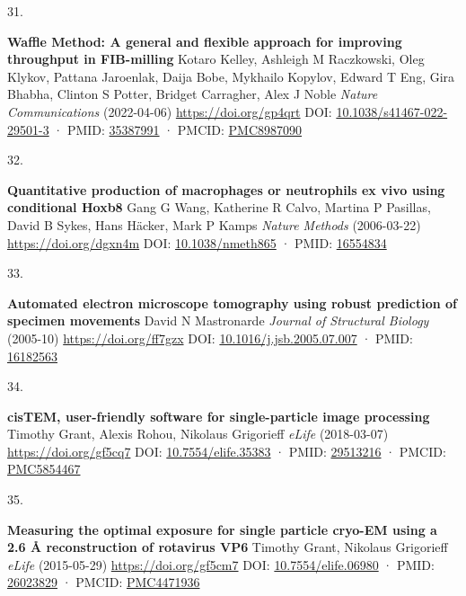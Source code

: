 \documentclass[
]{article}
\newlength{\cslhangindent}
\newlength{\csllabelwidth}
\newlength{\cslentryspacingunit} %
\newenvironment{CSLReferences}[2] %
 {%
  \setlength{\parindent}{0pt}
  \ifodd #1
  \let\oldpar\par
  \def\par{\hangindent=\cslhangindent\oldpar}
  \fi
  \setlength{\parskip}{#2\cslentryspacingunit}
 }%
 {}
\newcommand{\CSLBlock}[1]{#1\hfill\break}
\newcommand{\CSLLeftMargin}[1]{\parbox[t]{\csllabelwidth}{#1}}
\newcommand{\CSLRightInline}[1]{\parbox[t]{\linewidth - \csllabelwidth}{#1}\break}
\begin{document}
\begin{CSLReferences}{0}{0}
\leavevmode{}%
\CSLLeftMargin{31. }%
\CSLRightInline{\textbf{Waffle Method: A general and flexible approach for improving throughput in FIB-milling}
\CSLBlock{Kotaro Kelley, Ashleigh M Raczkowski, Oleg Klykov, Pattana Jaroenlak, Daija Bobe, Mykhailo Kopylov, Edward T Eng, Gira Bhabha, Clinton S Potter, Bridget Carragher, Alex J Noble} \emph{Nature Communications} (2022-04-06) \url{https://doi.org/gp4qrt}
\CSLBlock{DOI: \href{https://doi.org/10.1038/s41467-022-29501-3}{10.1038/s41467-022-29501-3} · PMID: \href{https://www.ncbi.nlm.nih.gov/pubmed/35387991}{35387991} · PMCID: \href{https://www.ncbi.nlm.nih.gov/pmc/articles/PMC8987090}{PMC8987090}}}

\leavevmode{}%
\CSLLeftMargin{32. }%
\CSLRightInline{\textbf{Quantitative production of macrophages or neutrophils ex vivo using conditional Hoxb8}
\CSLBlock{Gang G Wang, Katherine R Calvo, Martina P Pasillas, David B Sykes, Hans Häcker, Mark P Kamps} \emph{Nature Methods} (2006-03-22) \url{https://doi.org/dgxn4m}
\CSLBlock{DOI: \href{https://doi.org/10.1038/nmeth865}{10.1038/nmeth865} · PMID: \href{https://www.ncbi.nlm.nih.gov/pubmed/16554834}{16554834}}}

\leavevmode{}%
\CSLLeftMargin{33. }%
\CSLRightInline{\textbf{Automated electron microscope tomography using robust prediction of specimen movements}
\CSLBlock{David N Mastronarde} \emph{Journal of Structural Biology} (2005-10) \url{https://doi.org/ff7gzx}
\CSLBlock{DOI: \href{https://doi.org/10.1016/j.jsb.2005.07.007}{10.1016/j.jsb.2005.07.007} · PMID: \href{https://www.ncbi.nlm.nih.gov/pubmed/16182563}{16182563}}}

\leavevmode{}%
\CSLLeftMargin{34. }%
\CSLRightInline{\textbf{cisTEM, user-friendly software for single-particle image processing}
\CSLBlock{Timothy Grant, Alexis Rohou, Nikolaus Grigorieff} \emph{eLife} (2018-03-07) \url{https://doi.org/gf5cq7}
\CSLBlock{DOI: \href{https://doi.org/10.7554/elife.35383}{10.7554/elife.35383} · PMID: \href{https://www.ncbi.nlm.nih.gov/pubmed/29513216}{29513216} · PMCID: \href{https://www.ncbi.nlm.nih.gov/pmc/articles/PMC5854467}{PMC5854467}}}

\leavevmode{}%
\CSLLeftMargin{35. }%
\CSLRightInline{\textbf{Measuring the optimal exposure for single particle cryo-EM using a 2.6 Å reconstruction of rotavirus VP6}
\CSLBlock{Timothy Grant, Nikolaus Grigorieff} \emph{eLife} (2015-05-29) \url{https://doi.org/gf5cm7}
\CSLBlock{DOI: \href{https://doi.org/10.7554/elife.06980}{10.7554/elife.06980} · PMID: \href{https://www.ncbi.nlm.nih.gov/pubmed/26023829}{26023829} · PMCID: \href{https://www.ncbi.nlm.nih.gov/pmc/articles/PMC4471936}{PMC4471936}}}


\end{CSLReferences}
\end{document}
